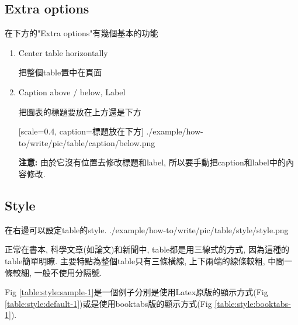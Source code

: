 \newpage
\subsection{Extra options}

  在下方的"Extra options"有幾個基本的功能

\begin{enumerate}

  \item
  {
    Center table horizontally

    把整個table置中在頁面

  } %

  \item
  {
    Caption above / below, Label

    把圖表的標題要放在上方還是下方

    {
      [scale=0.4,
        caption={標題放在下方}]
      {./example/how-to/write/pic/table/caption/below.png}
    }

    {\bf 注意:} 由於它沒有位置去修改標題和label, 所以要手動把caption和label中的內容修改.
  } %
\end{enumerate}


\newpage
\subsection{Style}

  在右邊可以設定table的style.
  \InsertCenterImage
    {./example/how-to/write/pic/table/style/style.png}

   正常在書本, 科學文章(如論文)和新聞中, table都是用三線式的方式, 因為這種的table簡單明瞭. 主要特點為整個table只有三條橫線, 上下兩端的線條較粗, 中間一條較細, 一般不使用分隔號.

  Fig \ref{table:style:sample-1}是一個例子分別是使用Latex原版的顯示方式(Fig \ref{table:style:default-1})或是使用booktabs版的顯示方式(Fig \ref{table:style:booktabs-1}).

